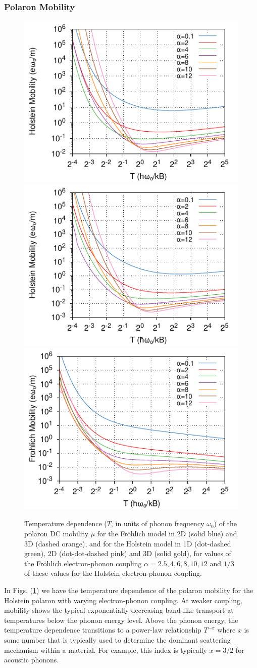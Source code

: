 \subsubsection{Polaron Mobility}

\begin{figure}[!tbp]
    \includegraphics[width=.49\textwidth]{figures/holstein-2d-mobility-temp-00625to32-COLOUR.pdf}
    \includegraphics[width=.49\textwidth]{chapters/responsefunctions/figures/holstein-3d-mobility-temp-00625to32-COLOUR.pdf}
    \includegraphics[width=.49\textwidth]{chapters/responsefunctions/figures/frohlich-3d-mobility-temp-00625to32-COLOUR.pdf}
    \caption{Temperature dependence ($T$, in units of phonon frequency $\omega_0$) of the polaron DC mobility $\mu$ for the Fr\"ohlich model in 2D (solid blue) and 3D (dashed orange), and for the Holstein model in 1D (dot-dashed green), 2D (dot-dot-dashed pink) and 3D (solid gold), for values of the Fr\"ohlich electron-phonon coupling $\alpha = 2.5, 4, 6, 8, 10, 12$ and $1/3$ of these values for the Holstein electron-phonon coupling.}
    \label{fig:mobility_temp}
\end{figure}
In Figs. (\ref{fig:mobility_temp}) we have the temperature dependence of the polaron mobility for the Holstein polaron with varying electron-phonon coupling. At weaker coupling, mobility shows the typical exponentially decreasing band-like transport at temperatures below the phonon energy level. Above the phonon energy, the temperature dependence transitions to a power-law relationship $T^{-x}$ where $x$ is some number that is typically used to determine the dominant scattering mechanism within a material. For example, this index is typically $x = 3/2$ for acoustic phonons. 

